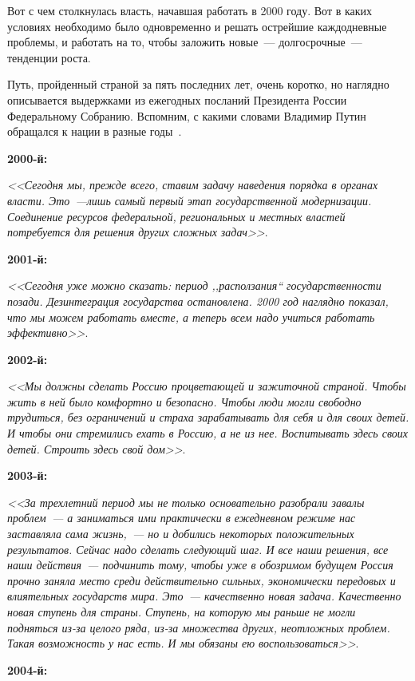 \documentclass[article, 12pt, russian, oneside]{ncc}
\begin{document}
Вот с чем столкнулась власть, начавшая работать в 2000 году. Вот в
каких условиях необходимо было одновременно и решать острейшие
каждодневные проблемы, и работать на то, чтобы заложить новые~---
долгосрочные~--- тенденции роста.

Путь, пройденный страной за пять последних лет, очень коротко, но
наглядно описывается выдержками из ежегодных посланий Президента
России Федеральному Собранию. Вспомним, с какими словами Владимир
Путин обращался к нации в разные годы~\cite{NPR_Idea}.

\textbf{2000-й:}

\emph{<<Сегодня мы, прежде всего, ставим задачу наведения порядка в
  органах власти. Это~---лишь самый первый этап государственной
  модернизации. Соединение ресурсов федеральной, региональных и
  местных властей потребуется для решения других сложных
  задач>>}\cite{Putin_2000}.

\textbf{2001-й:}

\emph{<<Сегодня уже можно сказать: период ,,расползания``
  государственности позади. Дезинтеграция государства
  остановлена. 2000 год наглядно показал, что мы можем работать
  вместе, а теперь всем надо учиться работать
  эффективно>>}\cite{Putin_2001}.

\textbf{2002-й:}

\emph{<<Мы должны сделать Россию процветающей и зажиточной
  страной. Чтобы жить в ней было комфортно и безопасно. Чтобы люди
  могли свободно трудиться, без ограничений и страха зарабатывать для
  себя и для своих детей. И чтобы они стремились ехать в Россию, а не
  из нее. Воспитывать здесь своих детей. Строить здесь свой
  дом>>}\cite{Putin_2002}.

\textbf{2003-й:}

\emph{<<За трехлетний период мы не только основательно разобрали
  завалы проблем~--- а заниматься ими практически в ежедневном режиме
  нас заставляла сама жизнь,~--- но и добились некоторых положительных
  результатов. Сейчас надо сделать следующий шаг. И все наши решения,
  все наши действия~--- подчинить тому, чтобы уже в обозримом будущем
  Россия прочно заняла место среди действительно сильных, экономически
  передовых и влиятельных государств мира. Это~--- качественно новая
  задача. Качественно новая ступень для страны. Ступень, на которую мы
  раньше не могли подняться из-за целого ряда, из-за множества других,
  неотложных проблем. Такая возможность у нас есть. И мы обязаны ею
  воспользоваться>>}\cite{Putin_2003}.

\textbf{2004-й:}
\end{document}
